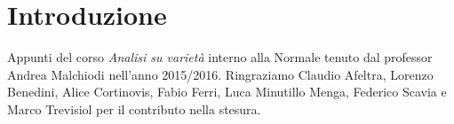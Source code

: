\chapter{Introduzione}

Appunti del corso \emph{Analisi su varietà} interno alla Normale tenuto dal professor Andrea Malchiodi nell'anno 2015/2016.
Ringraziamo Claudio Afeltra, Lorenzo Benedini, Alice Cortinovis, Fabio Ferri, Luca Minutillo Menga, Federico Scavia e Marco Trevisiol per il contributo nella stesura.